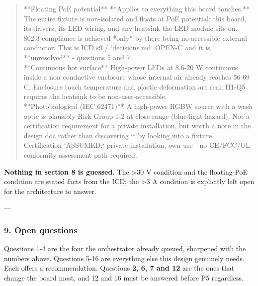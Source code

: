 \documentclass[11pt,a4paper]{article}
\begin{document}
\begin{quote}
\textbar{} {*}{*}Floating PoE potential{*}{*} \textbar{} {*}{*}Applies to everything this board touches.{*}{*} The entire fixture is non-isolated and floats at PoE potential: this board, its drivers, its LED wiring, and any heatsink the LED module sits on. 802.3 compliance is achieved {*}only{*} by there being no accessible external conductor. This is ICD s9 / `decisions.md` OPEN-C and it is {*}{*}unresolved{*}{*} - questions 5 and 7. \textbar{}\\
\textbar{} {*}{*}Continuous hot surface{*}{*} \textbar{} High-power LEDs at 8.6-20 W continuous inside a non-conductive enclosure whose internal air already reaches 56-69 C. Enclosure touch temperature and plastic deformation are real; H1-Q5 requires the heatsink to be non-user-accessible. \textbar{}\\
\textbar{} {*}{*}Photobiological (IEC 62471){*}{*} \textbar{} A high-power RGBW source with a wash optic is plausibly Risk Group 1-2 at close range (blue-light hazard). Not a certification requirement for a private installation, but worth a note in the design doc rather than discovering it by looking into a fixture. \textbar{}\\
\textbar{} Certification \textbar{} `ASSUMED:` private installation, own use - no CE/FCC/UL conformity assessment path required. \textbar{}
\end{quote}
\textbf{Nothing in section 8 is guessed.} The \textgreater{}30 V condition and the floating-PoE condition are stated facts from the ICD; the \textgreater{}3 A condition is explicitly left open for the architecture to answer.

---

\subsubsection*{9. Open questions}
Questions 1-4 are the four the orchestrator already queued, sharpened with the numbers above. Questions 5-16 are everything else this design genuinely needs. Each offers a recommendation. Questions \textbf{2, 6, 7 and 12} are the ones that change the board most, and 12 and 16 must be answered before P5 regardless.
\end{document}

